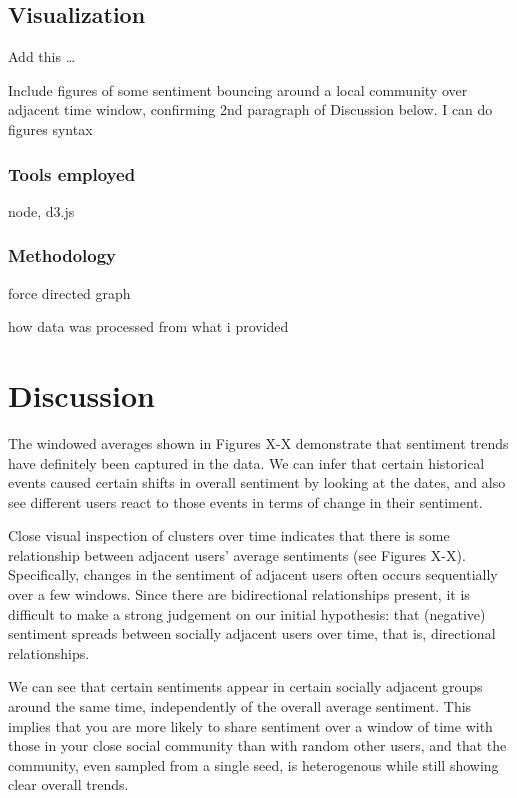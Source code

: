 \documentclass[11pt]{article}
\begin{document}
\subsection{Visualization}
Add this \dots\newline

Include figures of some sentiment bouncing around a local community over adjacent time window, confirming 2nd paragraph of Discussion below. I can do figures syntax

\subsubsection{Tools employed}
node, d3.js

\subsubsection{Methodology}
force directed graph\newline

how data was processed from what i provided


\section{Discussion}
The windowed averages shown in Figures X-X demonstrate that sentiment trends have definitely been captured in the data. We can infer that certain historical events caused certain shifts in overall sentiment by looking at the dates, and also see different users react to those events in terms of change in their sentiment.\newline

Close visual inspection of clusters over time indicates that there is some relationship between adjacent users' average sentiments (see Figures X-X). Specifically, changes in the sentiment of adjacent users often occurs sequentially over a few windows. Since there are bidirectional relationships present, it is difficult to make a strong judgement on our initial hypothesis: that (negative) sentiment spreads between socially adjacent users over time, that is, directional relationships.\newline

We can see that certain sentiments appear in certain socially adjacent groups around the same time, independently of the overall average sentiment. This implies that you are more likely to share sentiment over a window of time with those in your close social community than with random other users, and that the community, even sampled from a single seed, is heterogenous while still showing clear overall trends.\newline
\end{document}
